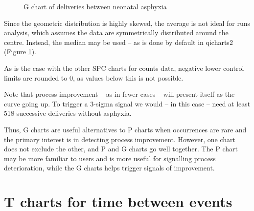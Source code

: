 \documentclass[
]{book}
\makeatletter
\newenvironment{Shaded}{\begin{snugshade}}{\end{snugshade}}
\newcommand{\AttributeTok}[1]{\textcolor[rgb]{0.13,0.29,0.53}{#1}}
\newcommand{\CommentTok}[1]{\textcolor[rgb]{0.56,0.35,0.01}{\textit{#1}}}
\newcommand{\FunctionTok}[1]{\textcolor[rgb]{0.13,0.29,0.53}{\textbf{#1}}}
\newcommand{\NormalTok}[1]{#1}
\newcommand{\OtherTok}[1]{\textcolor[rgb]{0.56,0.35,0.01}{#1}}
\newcommand{\SpecialCharTok}[1]{\textcolor[rgb]{0.81,0.36,0.00}{\textbf{#1}}}
\newcommand{\StringTok}[1]{\textcolor[rgb]{0.31,0.60,0.02}{#1}}
\newcommand*\pandocbounded[1]{%
  \sbox\pandoc@box{#1}%
  \Gscale@div\@tempa{\textheight}{\dimexpr\ht\pandoc@box+\dp\pandoc@box\relax}%
  \Gscale@div\@tempb{\linewidth}{\wd\pandoc@box}%
  \ifdim\@tempb\p@<\@tempa\p@\let\@tempa\@tempb\fi%
  \ifdim\@tempa\p@<\p@\scalebox{\@tempa}{\usebox\pandoc@box}%
  \else\usebox{\pandoc@box}%
  \fi%
}
\makeatother
\begin{document}
\begin{Shaded}
\end{Shaded}

\begin{figure}
\centering
\pandocbounded{}
\caption{\label{fig:rare-fig4}G chart of deliveries between neonatal asphyxia}
\end{figure}

Since the geometric distribution is highly skewed, the average is not ideal for runs analysis, which assumes the data are symmetrically distributed around the centre. Instead, the median may be used -- as is done by default in qicharts2 (Figure \ref{fig:rare-fig4}).

As is the case with the other SPC charts for counts data, negative lower control limits are rounded to 0, as values below this is not possible.

Note that process improvement -- as in fewer cases -- will present itself as the curve going up. To trigger a 3-sigma signal we would -- in this case -- need at least 518 successive deliveries without asphyxia.

Thus, G charts are useful alternatives to P charts when occurrences are rare and the primary interest is in detecting process improvement. However, one chart does not exclude the other, and P and G charts go well together. The P chart may be more familiar to users and is more useful for signalling process deterioration, while the G charts helps trigger signals of improvement.

\section{T charts for time between events}\label{t-charts-for-time-between-events}
\end{document}
